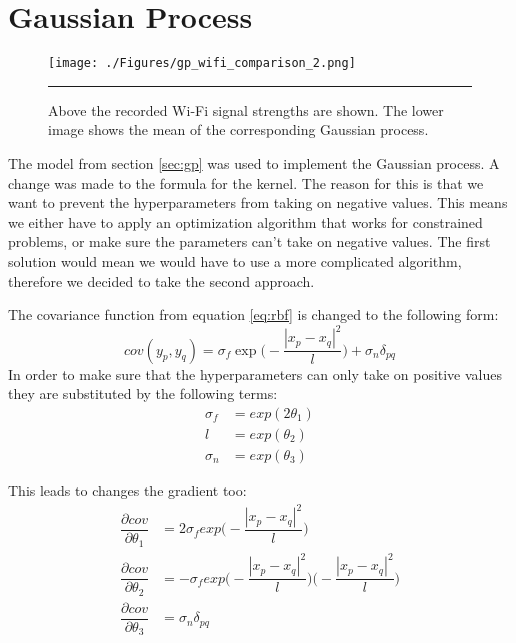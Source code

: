 \section{Gaussian Process}
\begin{figure}[htbp]
	\centering
		\texttt{[image: ./Figures/gp\_wifi\_comparison\_2.png]}
		\rule{35em}{0.5pt}
	\caption[Wi-Fi data and the corresponding Gaussian process]{Above the recorded Wi-Fi signal strengths are shown. The lower image shows the mean of the corresponding Gaussian process.}
	\label{fig:gp_wifi_comparison}
\end{figure}
The model from section \ref{sec:gp} was used to implement the Gaussian process. A change was made to the formula for the kernel. The reason for this is that we want to prevent the hyperparameters from taking on negative values. This means we either have to apply an optimization algorithm that works for constrained problems, or make sure the parameters can't take on negative values. The first solution would mean we would have to use a more complicated algorithm, therefore we decided to take the second approach. 

The covariance function from equation \ref{eq:rbf} is changed to the following form:
\begin{equation}
cov(y_p,y_q) = \sigma_f \exp\bigg(-\dfrac{|x_p-x_q|^2}{l}\bigg) + \sigma_n \delta_{pq}
\end{equation}
In order to make sure that the hyperparameters can only take on positive values they are substituted by the following terms:
\begin{equation}
\begin{aligned}
\sigma_f &= exp(2\theta_1)\\
l &= exp(\theta_2)\\
\sigma_n &= exp(\theta_3)
\end{aligned}
\end{equation}

This leads to changes the gradient too:
\begin{equation}
\begin{aligned}
\dfrac{\partial cov}{\partial \theta_1} &= 2\sigma_f exp\bigg(-\dfrac{|x_p-x_q|^2}{l}\bigg)\\
\dfrac{\partial cov}{\partial \theta_2} &= -\sigma_f exp\bigg(-\dfrac{|x_p-x_q|^2}{l}\bigg)\bigg(-\dfrac{|x_p-x_q|^2}{l}\bigg)\\
\dfrac{\partial cov}{\partial \theta_3} &= \sigma_n\delta_{pq}
\end{aligned}
\end{equation}

